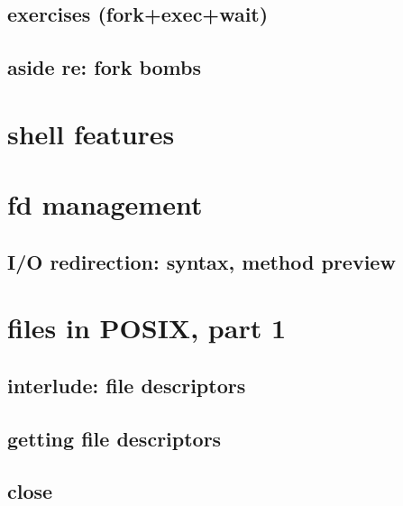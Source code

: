 


\subsection{exercises (fork+exec+wait)}



\subsection{aside re: fork bombs}



\section{shell features}


\section{fd management}
\subsection{I/O redirection: syntax, method preview}



\section{files in POSIX, part 1}

\subsection{interlude: file descriptors}





\subsection{getting file descriptors}




\subsection{close}

